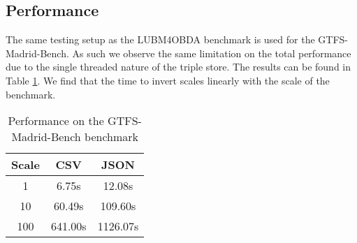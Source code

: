 \subsection{Performance}
The same testing setup as the LUBM4OBDA benchmark is used for the GTFS-Madrid-Bench. As such we observe the same limitation on the total performance due to the single threaded nature of the triple store. The results can be found in Table \ref{table:gtfs-madrid-bench_performance}. We find that the time to invert scales linearly with the scale of the benchmark.

\begin{table}[h]
    \centering
    \begin{tabular}{|c|c|c|}
        \hline
        \textbf{Scale} & \textbf{CSV} & \textbf{JSON} \\
        \hline
        1              & 6.75s        & 12.08s        \\ %
        10             & 60.49s       & 109.60s       \\ %
        100            & 641.00s      & 1126.07s      \\ 
        \hline
    \end{tabular}
    \caption{\centering Performance on the GTFS-Madrid-Bench benchmark}
    \label{table:gtfs-madrid-bench_performance}
\end{table}